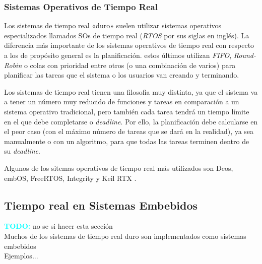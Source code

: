 \subsubsection{Sistemas Operativos de Tiempo Real}
Los sistemas de tiempo real «duro» suelen utilizar sistemas operativos especializados llamados SOs de tiempo real (\textit{RTOS} por sus siglas en inglés). La diferencia más importante de los sistemas operativos de tiempo real con respecto a los de propósito general es la planificación. estos últimos utilizan \textit{FIFO}, \textit{Round-Robin} o colas con prioridad entre otros (o una combinación de varios) para planificar las tareas que el sistema o los usuarios van creando y terminando.

Los sistemas de tiempo real tienen una filosofia muy distinta, ya que el sistema va a tener un número muy reducido de funciones y tareas en comparación a un sistema operativo tradicional, pero también cada tarea tendrá un tiempo límite en el que debe completarse o \textit{deadline}. Por ello, la planificación debe calcularse en el peor caso (con el máximo número de tareas que se dará en la realidad), ya sea manualmente o con un algoritmo, para que todas las tareas terminen dentro de su \textit{deadline}.

Algunos de los sitemas operativos de tiempo real más utilizados son Deos, embOS, FreeRTOS, Integrity y Keil RTX \cite{lynx2024rtos}.

\subsection{Tiempo real en Sistemas Embebidos}
\textbf{\textcolor{cyan}{TODO:}} no se si hacer esta sección\\

Muchos de los sistemas de tiempo real duro son implementados como sistemas embebidos\\

Ejemplos...

